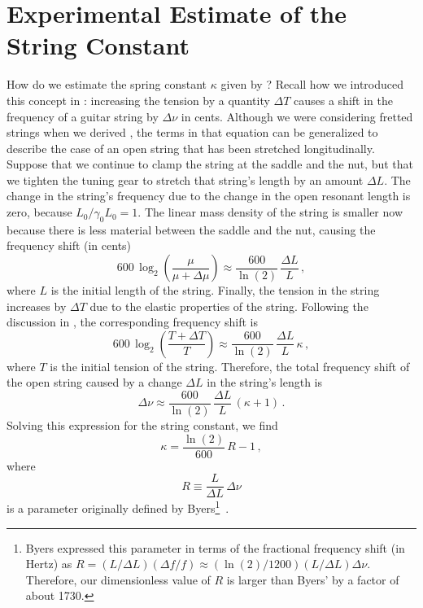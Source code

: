 %
%
%

 \section{Experimental Estimate of the String Constant\label{sct:exp}}

How do we estimate the spring constant $\kappa$ given by ? Recall how we introduced this concept in : increasing the tension by a quantity $\Delta T$ causes a shift in the frequency of a guitar string by $\Delta \nu$ in cents. Although we were considering fretted strings when we derived , the terms in that equation can be generalized to describe the case of an open string that has been stretched longitudinally. Suppose that we continue to clamp the string at the saddle and the nut, but that we tighten the tuning gear to stretch that string's length by an amount $\Delta L$. The change in the string's frequency due to the change in the open resonant length is zero, because $L_0 / \gamma_0 L_0 = 1$. The linear mass density of the string is smaller now because there is less material between the saddle and the nut, causing the frequency shift (in cents)
 \begin{equation}
600\, \log_2 \left(  \frac{\mu}{\mu + \Delta \mu} \right) \approx \frac{600}{\ln(2)}\, \frac{\Delta L}{L}\, ,
 \end{equation}
where $L$ is the initial length of the string. Finally, the tension in the string increases by $\Delta T$ due to the elastic properties of the string. Following the discussion in , the corresponding frequency shift  is
 \begin{equation}
600\, \log_2 \left(  \frac{T + \Delta T}{T} \right) \approx \frac{600}{\ln(2)}\, \frac{\Delta L}{L}\, \kappa\, ,
 \end{equation}
where $T$ is the initial tension of the string. Therefore, the total frequency shift of the open string caused by a change $\Delta L$ in the string's length is
 \begin{equation}
\Delta \nu \approx \frac{600}{\ln(2)}\, \frac{\Delta L}{L}\, (\kappa + 1)\, .
 \end{equation}
Solving this expression for the string constant, we find
 \begin{equation}
\kappa = \frac{\ln(2)}{600}\, R - 1\, ,
 \end{equation}
where
 \begin{equation}
R \equiv \frac{L}{\Delta L}\, \Delta \nu
 \end{equation}
is a parameter originally defined by Byers\footnote{Byers expressed this parameter in terms of the fractional frequency shift (in Hertz) as $R = (L/\Delta L) (\Delta f/f) \approx (\ln(2)/1200) (L/\Delta L) \Delta \nu$. Therefore, our dimensionless value of $R$ is larger than Byers' by a factor of about 1730.}~\cite{ref:byers1996cgi,ref:varieschi2010icf}.

